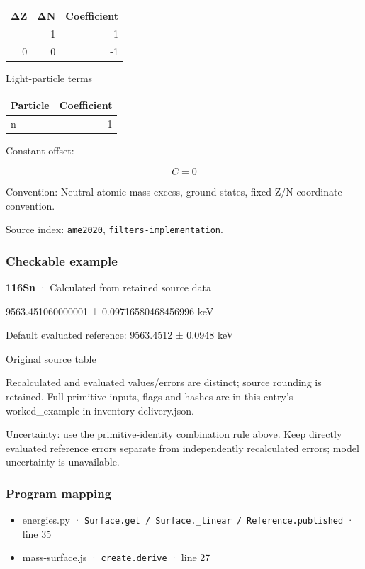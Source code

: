 \documentclass[
  11pt,
  letterpaper,
]{article}
\providecommand{\tightlist}{%
  \setlength{\itemsep}{0pt}\setlength{\parskip}{0pt}}
\begin{document}
\begin{longtable}[]{@{}rrr@{}}
\toprule\noalign{}
ΔZ & ΔN & Coefficient \\
\midrule\noalign{}
\endhead
\bottomrule\noalign{}
\endlastfoot
0 & -1 & 1 \\
0 & 0 & -1 \\
\end{longtable}

Light-particle terms

\begin{longtable}[]{@{}lr@{}}
\toprule\noalign{}
Particle & Coefficient \\
\midrule\noalign{}
\endhead
\bottomrule\noalign{}
\endlastfoot
n & 1 \\
\end{longtable}

Constant offset:

\[
C=0
\]

Convention: Neutral atomic mass excess, ground states, fixed Z/N
coordinate convention.

Source index: \texttt{ame2020}, \texttt{filters-implementation}.

\subsubsection{Checkable example}\label{checkable-example-3}

\textbf{116Sn} · Calculated from retained source data

9563.451060000001 ± 0.09716580468456996 keV

Default evaluated reference: 9563.4512 ± 0.0948 keV

\href{https://www-nds.iaea.org/amdc/ame2020/rct2_1.mas20.txt}{Original
source table}

Recalculated and evaluated values/errors are distinct; source rounding
is retained. Full primitive inputs, flags and hashes are in this entry's
worked\_example in inventory-delivery.json.

Uncertainty: use the primitive-identity combination rule above. Keep
directly evaluated reference errors separate from independently
recalculated errors; model uncertainty is unavailable.

\subsubsection{Program mapping}\label{program-mapping-3}

\begin{itemize}
\tightlist
\item
  energies.py ·
  \texttt{Surface.get\ /\ Surface.\_linear\ /\ Reference.published} ·
  line 35
\item
  mass-surface.js · \texttt{create.derive} · line 27
\end{itemize}
\end{document}
